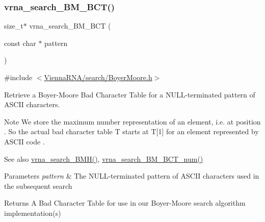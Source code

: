 \subsubsection{\texorpdfstring{vrna\+\_\+search\+\_\+\+B\+M\+\_\+\+B\+C\+T()}{vrna\_search\_BM\_BCT()}}
{\footnotesize\ttfamily size\+\_\+t$\ast$ vrna\+\_\+search\+\_\+\+B\+M\+\_\+\+B\+CT (\begin{DoxyParamCaption}\item[{const char $\ast$}]{pattern }\end{DoxyParamCaption})}



{\ttfamily \#include $<$\hyperlink{BoyerMoore_8h}{Vienna\+R\+N\+A/search/\+Boyer\+Moore.\+h}$>$}



Retrieve a Boyer-\/\+Moore Bad Character Table for a N\+U\+L\+L-\/terminated pattern of A\+S\+C\+II characters. 

\begin{DoxyNote}{Note}
We store the maximum number representation of an element, i.\+e. {} at position {}. So the actual bad character table {\ttfamily T} starts at {\ttfamily T}\mbox{[}1\mbox{]} for an element represented by A\+S\+C\+II code {}.
\end{DoxyNote}
\begin{DoxySeeAlso}{See also}
\hyperlink{group__search__utils_ga72574a7cf9786d825ce73f7f7748d3c4}{vrna\+\_\+search\+\_\+\+B\+M\+H()}, \hyperlink{group__search__utils_gad315a442e099c86c5dbf6c1c7933223d}{vrna\+\_\+search\+\_\+\+B\+M\+\_\+\+B\+C\+T\+\_\+num()}
\end{DoxySeeAlso}

\begin{DoxyParams}{Parameters}
{\em pattern} & The N\+U\+L\+L-\/terminated pattern of A\+S\+C\+II characters used in the subsequent search \\
\hline
\end{DoxyParams}
\begin{DoxyReturn}{Returns}
A Bad Character Table for use in our Boyer-\/\+Moore search algorithm implementation(s) 
\end{DoxyReturn}
